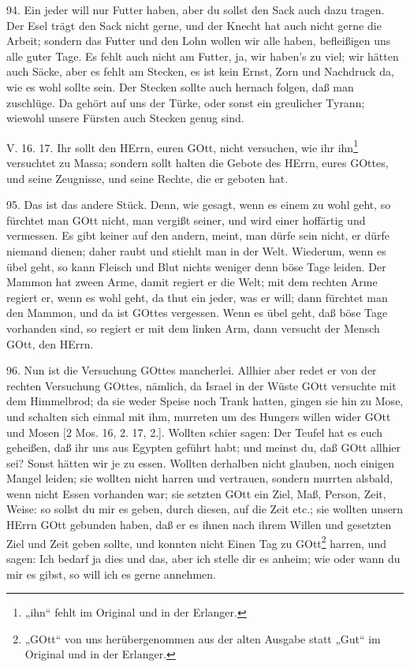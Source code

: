 94. Ein jeder will nur Futter haben, aber du sollst den Sack auch dazu tragen. Der Esel trägt den Sack nicht gerne, und der Knecht hat auch nicht gerne die Arbeit; sondern das Futter und den Lohn wollen wir alle haben, befleißigen uns alle guter Tage. Es fehlt auch nicht am Futter, ja, wir haben’s zu viel; wir hätten auch Säcke, aber es fehlt am Stecken, es ist kein Ernst, Zorn und Nachdruck da, wie es wohl sollte sein. Der Stecken sollte auch hernach folgen, daß man zuschlüge. Da gehört auf uns der Türke, oder sonst ein greulicher Tyrann; wiewohl unsere Fürsten auch Stecken genug sind.

\begin{schriftzitat}
V. 16. 17. Ihr sollt den HErrn, euren GOtt, nicht versuchen, wie ihr ihn\footnote{„ihn“ fehlt im Original und in der Erlanger.} versuchtet zu Massa; sondern sollt halten die Gebote des HErrn, eures GOttes, und seine Zeugnisse, und seine Rechte, die er geboten hat.
\end{schriftzitat}

95. Das ist das andere Stück. Denn, wie gesagt, wenn es einem zu wohl geht, so fürchtet man GOtt nicht, man vergißt seiner, und wird einer hoffärtig und vermessen. Es gibt keiner auf den andern, meint, man dürfe sein nicht, er dürfe niemand dienen; daher raubt und stiehlt man in der Welt. Wiederum, wenn es übel geht, so kann Fleisch und Blut nichts weniger denn böse Tage leiden. Der Mammon hat zween Arme, damit regiert er die Welt; mit dem rechten Arme regiert er, wenn es wohl geht, da thut ein jeder, was er will; dann fürchtet man den Mammon, und da ist GOttes vergessen. Wenn es übel geht, daß böse Tage vorhanden sind, so regiert er mit dem linken Arm, dann versucht der Mensch GOtt, den HErrn.

96. Nun ist die Versuchung GOttes mancherlei. Allhier aber redet er von der rechten Versuchung GOttes, nämlich, da Israel in der Wüste GOtt versuchte mit dem Himmelbrod; da sie weder Speise noch Trank hatten, gingen sie hin zu Mose, und schalten sich einmal mit ihm, murreten um des Hungers willen wider GOtt und Mosen [2 Mos. 16, 2. 17, 2.]. Wollten schier sagen: Der Teufel hat es euch geheißen, daß ihr uns aus Egypten geführt habt; und meinst du, daß GOtt allhier sei? Sonst hätten wir je zu essen. Wollten derhalben nicht glauben, noch einigen Mangel leiden; sie wollten nicht harren und vertrauen, sondern murrten alsbald, wenn nicht Essen vorhanden war; sie setzten GOtt ein Ziel, Maß, Person, Zeit, Weise: so sollst du mir es geben, durch diesen, auf die Zeit etc.; sie wollten unsern HErrn GOtt gebunden haben, daß er es ihnen nach ihrem Willen und gesetzten Ziel und Zeit geben sollte, und konnten nicht Einen Tag zu GOtt\footnote{„GOtt“ von uns herübergenommen aus der alten Ausgabe statt „Gut“ im Original und in der Erlanger.} harren, und sagen: Ich bedarf ja dies und das, aber ich stelle dir es anheim; wie oder wann du mir es gibst, so will ich es gerne annehmen.

